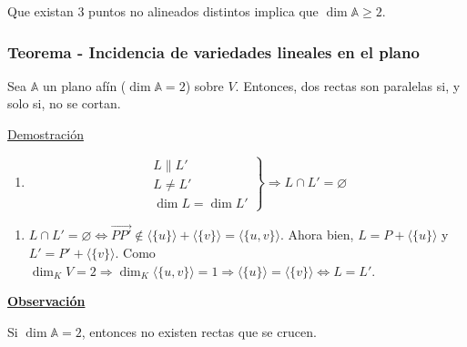 \documentclass[12pt, a4paper, ones, notitlepage, openany,titlepage]{article}
\newcommand{\demostracion}{\noindent\underline{Demostración}}
\newcommand{\observacion}{\noindent\underline{\textbf{Observación}}}
\begin{document}
\noindent Que existan 3 puntos no alineados distintos implica que $\dim \mathbb{A} \ge 2$.

\subsubsection{Teorema - Incidencia de variedades lineales en el plano}
Sea $\mathbb{A}$ un plano afín ($\dim \mathbb{A} = 2$) sobre $V$. Entonces, dos rectas son paralelas si, y solo si, no se cortan.

\demostracion
\begin{enumerate}[label=$\Longrightarrow/$]
	\item $$
	\left. \begin{array}{r}
		L \| L' \\
		L \neq L' \\
		\dim L = \dim L'
	\end{array} \right\} \Longrightarrow L \cap L' = \varnothing
	$$
\end{enumerate}
\begin{enumerate}[label=$\Longleftarrow/$]
	\item $L \cap L' = \varnothing \Longleftrightarrow \overrightarrow{PP'} \notin \langle\{u\}\rangle + \langle\{v\}\rangle = \langle\{u,v\}\rangle$. Ahora bien, $L = P + \langle\{u\}\rangle$ y $L' = P' + \langle\{v\}\rangle$. Como $\dim_K V = 2 \Longrightarrow \dim_K \langle\{u,v\}\rangle = 1 \Longrightarrow \langle\{u\}\rangle = \langle\{v\}\rangle \Longleftrightarrow L = L'$.
\end{enumerate}
\observacion

\noindent Si $\dim \mathbb{A} = 2$, entonces no existen rectas que se crucen.
\end{document}
